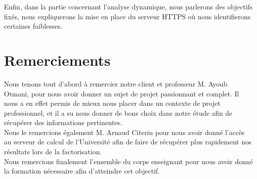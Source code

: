 Enfin, dans la partie concernant l'analyse dynamique, nous parlerons des objectifs fixés, nous expliquerons la mise en place du serveur HTTPS où nous identifierons certaines faiblesses.

\section*{Remerciements}

Nous tenons tout d'abord à remercier notre client et professeur M. Ayoub Otmani, pour nous avoir donner un sujet de projet passionnant et complet. Il nous a en effet permis de mieux nous placer dans un contexte de projet professionnel, et il a su nous donner de bons choix dans notre étude afin de récupérer des informations pertinentes.\\

Nous le remercions également M. Arnaud Citerin pour nous avoir donné l'accès au serveur de calcul de l'Université afin de faire de récupérer plus rapidement nos résultats lors de la factorisation.\\

Nous remercions finalement l'ensemble du corps enseignant pour nous avoir donné la formation nécessaire afin d'atteindre cet objectif.
